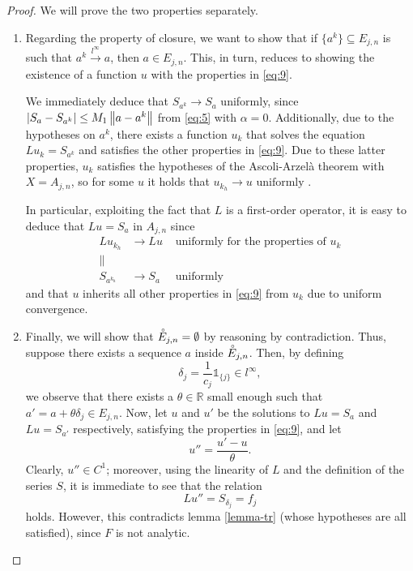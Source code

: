 \newpage
\begin{proof}
We will prove the two properties separately.
\begin{enumerate}
\item
Regarding the property of closure, we want to show that if $\{a^k\}\subseteq E_{j,n}$ is such that $a^k \xrightarrow{l^\infty} a$, then $a \in E_{j,n}$. This, in turn, reduces to showing the existence of a function $u$ with the properties in \eqref{eq:9}.

We immediately deduce that $S_{a^k} \rightarrow S_a$ uniformly, since $\left|S_a - S_{a^k}\right| \leq M_1 \left\lVert a-a^k\right\rVert$ from \eqref{eq:5} with $\alpha = 0$. Additionally, due to the hypotheses on $a^k$, there exists a function $u_k$ that solves the equation $Lu_k=S_{a^k}$ and satisfies the other properties in \eqref{eq:9}. Due to these latter properties, $u_k$ satisfies the hypotheses of the Ascoli-Arzelà theorem with $X=A_{j,n}$, so for some $u$ it holds that $u_{k_h} \rightarrow u \text{ uniformly }$.

In particular, exploiting the fact that $L$ is a first-order operator, it is easy to deduce that $Lu=S_a$ in $A_{j,n}$ since
\begin{align*}
Lu_{k_h}& \rightarrow Lu &\text{ uniformly for the properties of } u_k\\
\lVert \quad &  &\\
S_{a^{k_h}}& \rightarrow S_a &\text{ uniformly }
\end{align*}
and that $u$ inherits all other properties in \eqref{eq:9} from $u_k$ due to uniform convergence.
 
\item
Finally, we will show that $\accentset{\circ}{E}_{j,n}=\emptyset$ by reasoning by contradiction. Thus, suppose there exists a sequence $a$ inside $\accentset{\circ}{E}_{j,n}$. Then, by defining
$$\delta_j = \frac{1}{c_j} \mathds{1}_{\{j\}} \in l^\infty,$$
we observe that there exists a $\theta \in \mathbb{R}$ small enough such that $a'=a+\theta \delta_j \in E_{j,n}$.
Now, let $u$ and $u'$ be the solutions to $Lu=S_a$ and $Lu=S_{a'}$ respectively, satisfying the properties in \eqref{eq:9}, and let
$$u''=\frac{u'-u}{\theta}.$$ 
Clearly, $u'' \in C^1$; moreover, using the linearity of $L$ and the definition of the series $S$, it is immediate to see that the relation $$Lu''=S_{\delta_j}=f_j$$ holds. However, this contradicts lemma \ref{lemma-tr} (whose hypotheses are all satisfied), since $F$ is not analytic. 
\end{enumerate}
\end{proof}


